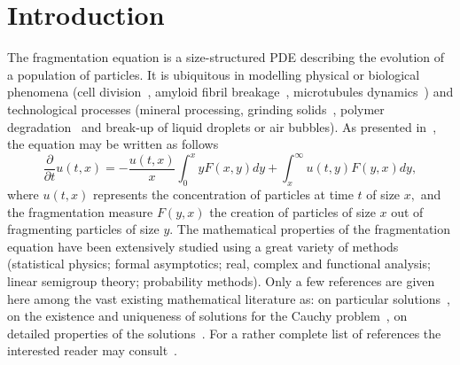 \documentclass[10pt]{amsart}
\theoremstyle{definition}\newtheorem{defi}[theo]{Definition}\newtheorem{rema}[theo]{Remark}\newtheorem{exam}[theo]{Example}\newtheorem{exem}[theo]{Example}\newtheorem{nota}[theo]{Notation}
\newcommand*\dst{\displaystyle}
\newcommand*\p{\partial}
\begin{document}
\section{Introduction}\label{sec:intro}
The fragmentation equation is a size-structured PDE describing the evolution of a population of particles. It is ubiquitous in modelling physical or biological phenomena (cell division~\cite{Perthame2007}, amyloid fibril breakage~\cite{XR13}, microtubules dynamics~\cite{HHTW18}) and technological processes (mineral processing, grinding solids~\cite{Kolmogorov40}, polymer degradation~\cite{Montroll_Simha40} and break-up of liquid droplets or air bubbles).
As presented in~\cite{Melzak}, the equation may be written as follows
\begin{equation}\label{eq:frag_intro_gen}
\dfrac{\p}{\p t}u(t,x) =- \frac {u(t, x)} {x}\int _0^x y F(x, y)dy + \dst\int_{x}^{\infty} u(t,y)F(y, x) dy,
\end{equation}
where $u(t,x)$ represents the concentration of particles at time $t$ of size $x,$ and the fragmentation measure $F(y,x)$ the creation of particles of size $x$ out of fragmenting particles of size $y$. The mathematical properties of the fragmentation equation have been extensively studied using a great variety of methods (statistical physics; formal asymptotics; real, complex and functional analysis; linear semigroup theory; probability methods). Only a few references are given here among the vast existing mathematical literature as: on particular solutions~\cite{Montroll_Simha40, ZiffMcGrady85}, on the existence and uniqueness of solutions for the Cauchy problem~\cite{Banasiak1,BallCarr, DubovskiStewart,Melzak, MLM, Stewart90}, on detailed properties of the solutions~\cite{BCG13,Bertoin1,CCM,  Haas2008,PerthameRyzhik}. For a rather complete list of references the interested reader may consult~\cite{Banasiak1, zora77208,Banasiak2}.
\end{document}
